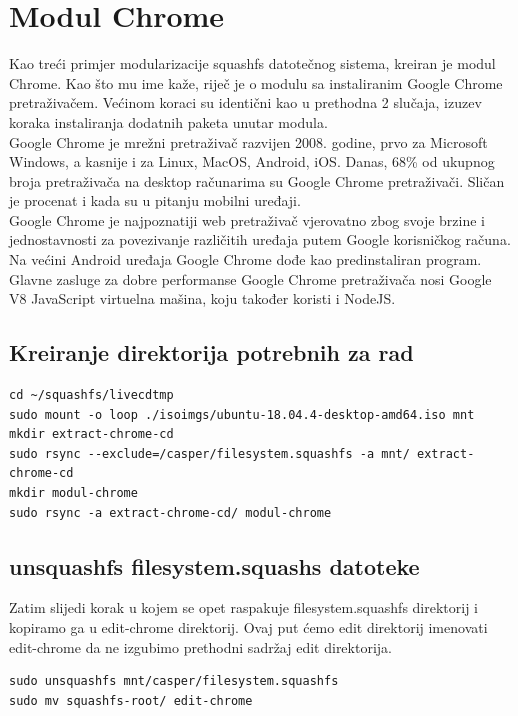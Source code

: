\documentclass[12pt,vi]{mitthesis}
\begin{document}
\section*{Modul Chrome}
\indent
Kao treći primjer modularizacije squashfs datotečnog sistema, kreiran je modul Chrome. Kao što mu ime kaže, riječ je o modulu sa instaliranim Google Chrome pretraživačem. Većinom koraci su identični kao u prethodna 2 slučaja, izuzev koraka instaliranja dodatnih paketa unutar modula.\\
\indent
Google Chrome je mrežni pretraživač razvijen 2008. godine, prvo za Microsoft Windows, a kasnije i za Linux, MacOS, Android, iOS. Danas, 68\% od ukupnog broja pretraživača na desktop računarima su Google Chrome pretraživači. Sličan je procenat i kada su u pitanju mobilni uređaji.\\
\indent
Google Chrome je najpoznatiji web pretraživač vjerovatno zbog svoje brzine i jednostavnosti za povezivanje različitih uređaja putem Google korisničkog računa. Na većini Android uređaja Google Chrome dođe kao predinstaliran program. Glavne zasluge za dobre performanse Google Chrome pretraživača nosi Google V8 JavaScript virtuelna mašina, koju također koristi i NodeJS.
\subsection*{Kreiranje direktorija potrebnih za rad}
\begin{lstlisting}[style=BashInputStyle]
cd ~/squashfs/livecdtmp
sudo mount -o loop ./isoimgs/ubuntu-18.04.4-desktop-amd64.iso mnt
mkdir extract-chrome-cd
sudo rsync --exclude=/casper/filesystem.squashfs -a mnt/ extract-chrome-cd
mkdir modul-chrome
sudo rsync -a extract-chrome-cd/ modul-chrome
\end{lstlisting}

\subsection*{unsquashfs filesystem.squashs datoteke}

Zatim slijedi korak u kojem se opet raspakuje filesystem.squashfs direktorij i kopiramo ga u edit-chrome direktorij. Ovaj put ćemo edit direktorij imenovati edit-chrome da ne izgubimo prethodni sadržaj edit direktorija.\\
\begin{lstlisting}[style=BashInputStyle]
sudo unsquashfs mnt/casper/filesystem.squashfs
sudo mv squashfs-root/ edit-chrome
\end{lstlisting}
\end{document}
